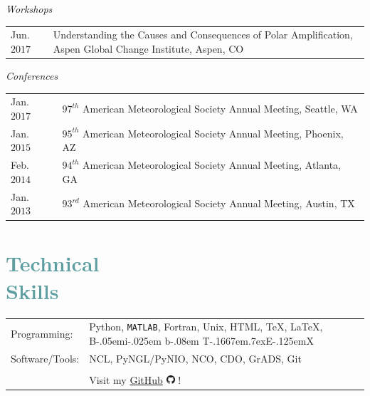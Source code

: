 \documentclass[margin,line,palatino,courier,10pt]{res}
\def\BibTeX{{\rm B\kern-.05em{\sc i\kern-.025em b}\kern-.08em
    T\kern-.1667em\lower.7ex\hbox{E}\kern-.125emX}}
\begin{document}
\begin{resume}
\textit{Workshops}
\vspace*{0.05in}\\
\begin{tabular}{@{}p{0.8in}p{4in}}
Jun. $2017$ & Understanding the Causes and Consequences of Polar Amplification, Aspen Global Change Institute, Aspen, CO
\end{tabular}

\textit{Conferences}
\vspace*{0.05in}\\
\begin{tabular}{@{}p{0.8in}p{4in}}
Jan. $2017$ & $97^ {th} $ American Meteorological Society Annual Meeting, Seattle, WA \\
Jan. $2015$ & $95^ {th} $ American Meteorological Society Annual Meeting, Phoenix, AZ \\
Feb. $2014$ & $94^ {th} $ American Meteorological Society Annual Meeting, Atlanta, GA \\
Jan. $2013$ & $93^ {rd} $ American Meteorological Society Annual Meeting, Austin, TX \\
\end{tabular}

\section{\sc \textcolor{CadetBlue}{\large{Technical \\ Skills}}}
\vspace*{0.05in}
\begin{tabular}{@{}p{0.8in}p{6in}}

Programming:& Python, \texttt{MATLAB}, Fortran, Unix, HTML, \TeX, \LaTeX, \BibTeX \\
Software/Tools: & NCL, PyNGL/PyNIO, NCO, CDO, GrADS, Git\\\\

& Visit my \href{https://github.com/zmlabe}{GitHub} \includegraphics[height=9pt]{github.png} !\\
\end{tabular}


\noindent\makebox[\linewidth][r]{\rule{\textwidth}{5pt}}
\newpage


\end{resume}
\end{document}

